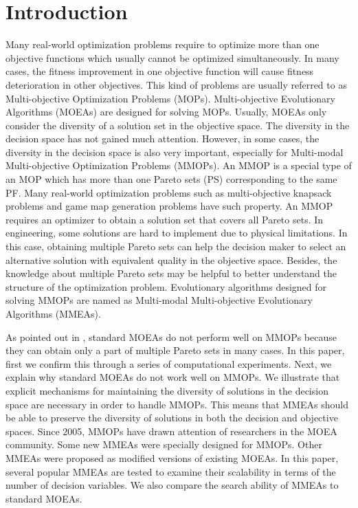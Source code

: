 \documentclass[conference]{IEEEtran}
\begin{document}
\section{Introduction}
Many real-world optimization problems require to optimize more than one objective functions which usually cannot be optimized simultaneously. In many cases, the fitness improvement in one objective function will cause fitness deterioration in other objectives. This kind of problems are usually referred to as Multi-objective Optimization Problems (MOPs). Multi-objective Evolutionary Algorithms (MOEAs) are designed for solving MOPs. Usually, MOEAs only consider the diversity of a solution set in the objective space. The diversity in the decision space has not gained much attention. However, in some cases, the diversity in the decision space is also very important, especially for Multi-modal Multi-objective Optimization Problems (MMOPs). An MMOP is a special type of an MOP which has more than one Pareto sets (PS) corresponding to the same PF. Many real-world optimization problems such as multi-objective knapsack problems \cite{jaszkiewicz2002performance} and game map generation problems \cite{togelius2010towards} have such property. An MMOP requires an optimizer to obtain a solution set that covers all Pareto sets. In engineering, some solutions are hard to implement due to physical limitations. In this case, obtaining multiple Pareto sets can help the decision maker to select an alternative solution with equivalent quality in the objective space. Besides, the knowledge about multiple Pareto sets may be helpful to better understand the structure of the optimization problem\cite{deb2001multi}. Evolutionary algorithms designed for solving MMOPs are named as Multi-modal Multi-objective Evolutionary Algorithms (MMEAs).

As pointed out in \cite{tanabe2019review} \cite{liang2016multimodal}, standard MOEAs do not perform well on MMOPs because they can obtain only a part of multiple Pareto sets in many cases. In this paper, first we confirm this through a series of computational experiments. Next, we explain why standard MOEAs do not work well on MMOPs. We illustrate that explicit mechanisms for maintaining the diversity of solutions in the decision space are necessary in order to handle MMOPs. This means that MMEAs should be able to preserve the diversity of solutions in both the decision and objective spaces. Since 2005, MMOPs have drawn attention of researchers in the MOEA community. Some new MMEAs were specially designed for MMOPs. Other MMEAs were proposed as modified versions of existing MOEAs. In this paper, several popular MMEAs are tested to examine their scalability in terms of the number of decision variables. We also compare the search ability of MMEAs to standard MOEAs.
\end{document}
